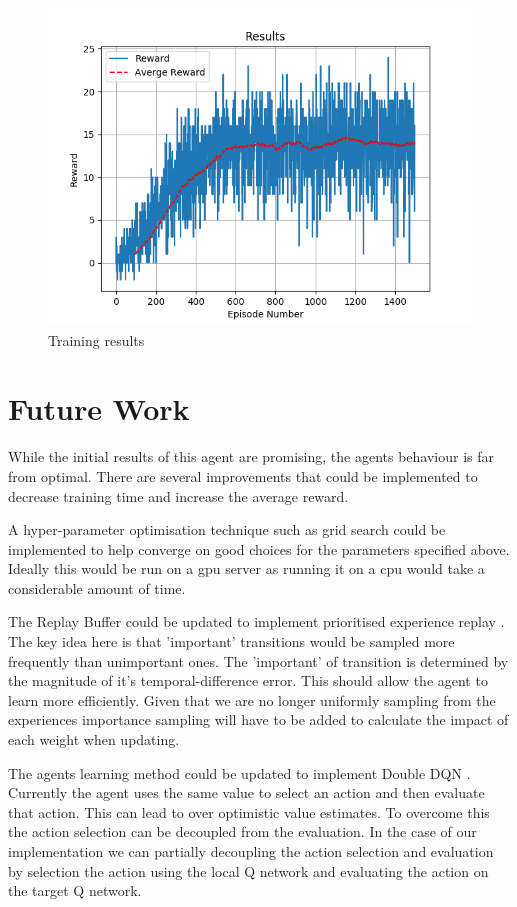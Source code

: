 \documentclass[12pt]{article}
\begin{document}
\begin{figure}
	\centering
	\includegraphics[width=0.8\linewidth]{./img/Results.png}
	\caption{Training results}
	\label{results}
\end{figure}

\section{Future Work}
While the initial results of this agent are promising, the agents behaviour is far from optimal.
There are several improvements that could be implemented to decrease training time and increase the average reward.

A hyper-parameter optimisation technique such as grid search could be implemented to help converge on good choices for the parameters 
specified above. 
Ideally this would be run on a gpu server as running it on a cpu would take a considerable amount of time.

The Replay Buffer could be updated to implement prioritised experience replay \cite{per_paper}. 
The key idea here is that 'important' transitions would be sampled more frequently than unimportant ones. 
The 'important' of transition is determined by the magnitude of it's temporal-difference error.
This should allow the agent to learn more efficiently. 
Given that we are no longer uniformly sampling from the experiences importance sampling will have to be added to calculate the impact of each weight when updating.

The agents learning method could be updated to implement Double DQN \cite{ddqn_paper}. 
Currently the agent uses the same value to select an action and then evaluate that action.
This can lead to over optimistic value estimates.
To overcome this the action selection can be decoupled from the evaluation.
In the case of our implementation we can partially decoupling the action selection and evaluation by selection the action using the local Q network and evaluating the action on the target Q network.

\printbibliography
\end{document}
